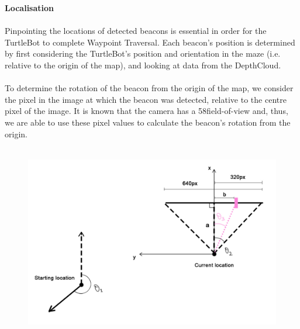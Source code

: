 \documentclass[titlepage,12pt,a4paper]{article}
\begin{document}
\large{\textbf{Localisation}} \\
\normalsize
\\
Pinpointing the locations of detected beacons is essential in order for the TurtleBot to complete Waypoint Traversal. Each beacon's position is determined by first considering the TurtleBot's position and orientation in the maze (i.e. relative to the origin of the map), and looking at data from the DepthCloud. \\
\\
To determine the rotation of the beacon from the origin of the map, we consider the pixel in the image at which the beacon was detected, relative to the centre pixel of the image. It is known that the camera has a 58\degree field-of-view and, thus, we are able to use these pixel values to calculate the beacon's rotation from the origin. \\
\\
\begin{figure}[h]
	\includegraphics[scale=0.3]{beacon.jpg}
\end{figure}
\end{document}

